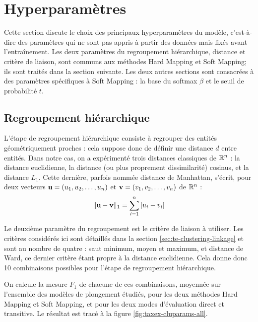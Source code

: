 
\section{Hyperparamètres}
\label{sec:te-hp}

Cette section discute le choix des principaux hyperparamètres du modèle, c'est-à-dire des paramètres qui ne sont pas appris à partir des données mais fixés avant l'entraînement. Les deux paramètres du regroupement hiérarchique, distance et critère de liaison, sont communs aux méthodes Hard Mapping et Soft Mapping; ils sont traités dans la section suivante. Les deux autres sections sont consacrées à des paramètres spécifiques à Soft Mapping : la base du softmax $\beta$ et le seuil de probabilité $t$.

\subsection{Regroupement hiérarchique}

L'étape de regroupement hiérarchique consiste à regrouper des entités géométriquement proches : cela suppose donc de définir une distance $d$ entre entités. Dans notre cas, on a expérimenté trois distances classiques de $\R^n$ : la distance euclidienne,  la distance (ou plus proprement dissimilarité) cosinus, et la distance $L_1$. Cette dernière, parfois nommée distance de Manhattan, s'écrit, pour deux vecteurs $\bf{u} = (u_1, u_2, \ldots, u_n)$ et $\bf{v} = (v_1, v_2, \ldots, v_n)$ de $\R^n$ :
\begin{equation}
    \| \bf{u - v} \|_1 = \sum_{i=1}^{n} | u_i - v_i |
\end{equation}

Le deuxième paramètre du regroupement est le critère de liaison à utiliser. Les critères considérés ici sont détaillés dans la section \ref{sec:te-clustering-linkage} et sont au nombre de quatre : saut minimum, moyen et maximum, et distance de Ward, ce dernier critère étant propre à la distance euclidienne. Cela donne donc 10 combinaisons possibles pour l'étape de regroupement hiérarchique.

On calcule la mesure $F_1$ de chacune de ces combinaisons, moyennée sur l'ensemble des modèles de plongement étudiés, pour les deux méthodes Hard Mapping et Soft Mapping, et pour les deux modes d'évaluation direct et transitive. Le résultat est tracé à la figure \ref{fig:taxex-cluparams-all}.

